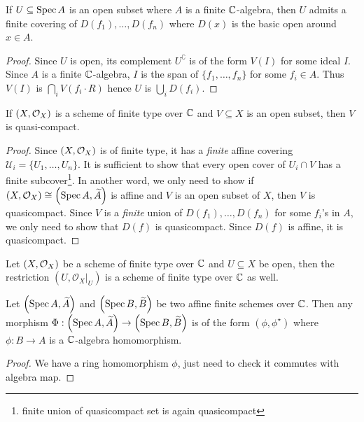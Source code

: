 \begin{lemma} If $U \subseteq \operatorname{Spec} A$ is an open subset where $A$ is a finite $\mathbb{C}$-algebra, then $U$ admits a finite covering of $D(f_{1}),\dots, D(f_{n})$ where $D(x)$ is the basic open around $x \in A$.
\end{lemma}
\begin{proof}
  Since $U$ is open, its complement $U^{\complement}$ is of the form $V(I)$ for some ideal $I$. Since $A$ is a finite $\mathbb{C}$-algebra, $I$ is the span of $\{f_{1},\dots, f_{n}\}$ for some $f_{i} \in A$. Thus $V(I)$ is $\bigcap_{i}V(f_{i}\cdot R)$ hence $U$ is $\bigcup_{i}D(f_{i})$.
\end{proof}

\begin{lemma}
   If $\left(X, \mathcal{O}_{X}\right)$ is a scheme of finite type over $\mathbb{C}$ and $V \subseteq X$ is an open subset, then $V$ is quasi-compact.
\end{lemma}
\begin{proof}
  Since $\left(X, \mathcal{O}_{X}\right)$ is of finite type, it has a {\em\/ finite} affine covering $\mathcal{U}_{i} = \{U_{1},\dots, U_{n}\}$.
  It is sufficient to show that every open cover of $U_{i} \cap V$ has a finite subcover\footnote{finite union of quasicompact set is again quasicompact}. In another word, we only need to show if $\left(X, \mathcal{O}_{X}\right) \cong \left(\operatorname*{Spec}{A}, \widetilde{A}\right)$ is affine and $V$ is an open subset of $X$, then $V$ is quasicompact. Since $V$ is a {\em finite\/} union of $D(f_{1}),\dots, D(f_{n})$ for some $f_{i}$'s in $A$, we only need to show that $D(f)$ is quasicompact. Since $D(f)$ is affine, it is quasicompact.
\end{proof}

\begin{corollary}
  Let $\left(X, \mathcal{O}_{X}\right)$ be a scheme of finite type over $\mathbb{C}$ and $U \subseteq X$ be open, then the restriction $(U, \mathcal{O}_{X}|_{U})$ is a scheme of finite type over $\mathbb{C}$ as well.
\end{corollary}

\begin{proposition}
  Let $\left(\operatorname*{Spec}{A}, \widetilde{A}\right)$ and $\left(\operatorname*{Spec}{B}, \widetilde{B}\right)$ be two affine finite schemes over $\mathbb{C}$. Then any morphism $\Phi : \left(\operatorname*{Spec}{A}, \widetilde{A}\right) \to \left(\operatorname*{Spec}{B}, \widetilde{B}\right)$ is of the form $(\phi, \phi^{\star})$ where $\phi : B \to A$ is a $\mathbb{C}$-algebra homomorphism.
\end{proposition}

\begin{proof}
  We have a ring homomorphism $\phi$, just need to check it commutes with algebra map.
\end{proof}

